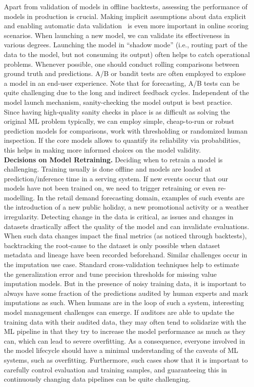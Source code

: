 \documentclass[11pt]{article}
\newcommand{\hdr}[1]{\noindent\textbf{#1.}}
\begin{document}
Apart from validation of models in offline backtests, assessing the performance of models in production is crucial. Making implicit assumptions about data explicit and enabling automatic data validation~\cite{Schelter2018} is even more important in online scoring scenarios. When launching a new model, we can validate its effectiveness in various degrees. Launching the model in ``shadow mode'' (i.e., routing part of the data to the model, but not consuming its output) often helps to catch operational problems. Whenever possible, one should conduct rolling comparisons between ground truth and predictions. A/B or bandit tests are often employed to explose a model in an end-user experience. Note that for forecasting, A/B tests can be quite challenging due to the long and indirect feedback cycles.  Independent of the model launch mechanism, sanity-checking the model output is best practice. Since having high-quality sanity checks in place is as difficult as solving the original ML problem typically, we can employ simple, cheap-to-run or robust prediction models for comparisons, work with thresholding or randomized human inspection. If the core models allows to quantify its reliability via probabilities, this helps in making  more informed choices on the model validity.\\

\hdr{Decisions on Model Retraining} Deciding when to retrain a model is challenging. Training usually is done offline and models are loaded at prediction/inference time in a serving system. If new events occur that our models have not been trained on, we need to trigger retraining or even re-modelling. In the retail demand forecasting domain, examples of such events are the introduction of a new public holiday, a new promotional activity or a weather irregularity. Detecting change in the data is critical, as issues and changes in datasets drastically affect the quality of the model and can invalidate evaluations. When such data changes impact the final metrics (as noticed through backtests), backtracking the root-cause to the dataset is only possible when dataset metadata and lineage have been recorded beforehand.
Similar challenges occur in the imputation use case. Standard cross-validation techniques help to estimate the generalization error and tune precision thresholds for missing value imputation models. But in the presence of noisy training data, it is important to always have some fraction of the predictions audited by human experts and mark imputations as such. When humans are in the loop of such a system, interesting model management challenges can emerge. If auditors are able to update the training data with their audited data, they may often tend to solidarize with the ML pipeline in that they try to increase the model performance as much as they can, which can lead to severe overfitting. As a consequence, everyone involved in the model lifecycle should have a minimal understanding of the caveats of ML systems, such as overfitting. Furthermore, such cases show that it is important to carefully control evaluation and training samples, and guaranteeing this in continuously changing data pipelines can be quite challenging.\\
\end{document}
